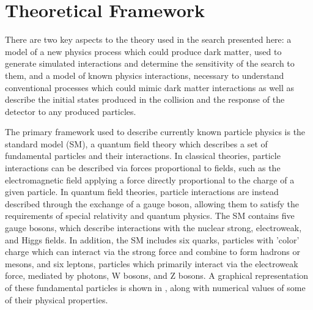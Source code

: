 \chapter{Theoretical Framework}
\label{theory}
There are two key aspects to the theory used in the search presented here: a model of a new physics process which could produce dark matter, used to generate simulated interactions and determine the sensitivity of the search to them, and a model of known physics interactions, necessary to understand conventional processes which could mimic dark matter interactions as well as describe the initial states produced in the collision and the response of the detector to any produced particles.

The primary framework used to describe currently known particle physics is the standard model (SM), a quantum field theory which describes a set of fundamental particles and their interactions.
In classical theories, particle interactions can be described via forces proportional to fields, such as the electromagnetic field applying a force directly proportional to the charge of a given particle.
In quantum field theories, particle interactions are instead described through the exchange of a gauge boson, allowing them to satisfy the requirements of special relativity and quantum physics. 
The SM contains five gauge bosons, which describe interactions with the nuclear strong, electroweak, and Higgs fields.
In addition, the SM includes six quarks, particles with 'color' charge which can interact via the strong force and combine to form hadrons or mesons, and six leptons, particles which primarily interact via the electroweak force, mediated by photons, W bosons, and Z bosons.
A graphical representation of these fundamental particles is shown in , along with numerical values of some of their physical properties.

